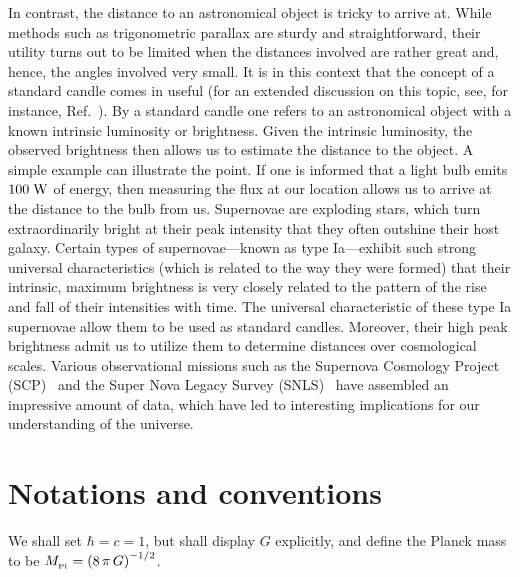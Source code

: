 \documentclass[12pt,a4paper,oneside]{book}
\def\Mpl{M_{_{\rm Pl}}}
\begin{document}
In contrast, the distance to an astronomical object is tricky to arrive at.
While methods such as trigonometric parallax are sturdy and straightforward,
their utility turns out to be limited when the distances involved are rather 
great and, hence, the angles involved very small.  
It is in this context that the concept of a standard candle comes in useful
(for an extended discussion on this topic, see, for instance,
Ref.~\cite{webb-1999}).
By a standard candle one refers to an astronomical object with a known
intrinsic 
luminosity or brightness.
Given the intrinsic luminosity, the observed brightness then allows us to 
estimate the distance to the object.
A simple example can illustrate the point.
If one is informed that a light bulb emits $100\; {\rm W}$ of energy, then
measuring the flux at our location allows us to arrive at the distance to 
the bulb from us.
Supernovae are exploding stars, which turn extraordinarily bright at their
peak intensity that they often outshine their host galaxy.
Certain types of supernovae---known as type Ia---exhibit such strong universal 
characteristics (which is related to the way they were formed) that their 
intrinsic, maximum brightness is very closely related to the pattern of the 
rise and fall of their intensities with time. 
The universal characteristic of these type Ia supernovae allow them to be used
as standard candles.
Moreover, their high peak brightness admit us to utilize them to determine
distances over cosmological scales.
Various observational missions such as the Supernova Cosmology 
Project (SCP)~\cite{scp} and the Super Nova Legacy Survey (SNLS)~\cite{snls} 
have assembled an impressive amount of data, which have led to interesting 
implications for our understanding of the universe.


\section{}



\section{Notations and conventions}


We shall set $\hbar=c=1$, but shall display $G$ explicitly, and define 
the Planck mass to be $\Mpl=\left(8\, \pi\, G\right)^{-1/2}$.
\end{document}
